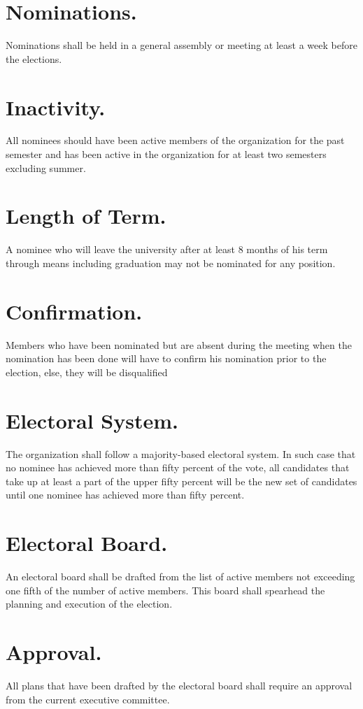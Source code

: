 \documentclass[12pt]{constitution}
\begin{document}
\section{Nominations.}
Nominations shall be held in a general assembly or meeting at least a week before the elections.

\section{Inactivity.}
All nominees should have been active members of the organization for the past semester and
has been active in the organization for at least two semesters excluding summer.

\section{Length of Term.}
A nominee who will leave the university after at least 8 months of his term
through means including graduation may not be nominated for any position.

\section{Confirmation.}
Members who have been nominated but are absent during the meeting when
the nomination has been done will have to confirm his nomination
prior to the election, else, they will be disqualified

\section{Electoral System.}
The organization shall follow a majority-based electoral system.
In such case that no nominee has achieved more than fifty percent 
of the vote, all candidates that take up at least a part of the upper
fifty percent will be the new set of candidates until one nominee has
achieved more than fifty percent.

\section{Electoral Board.}
An electoral board shall be drafted from the list of active members
not exceeding one fifth of the number of active members. 
This board shall spearhead the planning and execution of the election.

\section{Approval.}
All plans that have been drafted by the electoral board shall require an
approval from the current executive committee.
\end{document}
